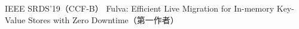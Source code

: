 \cvpub
{IEEE SRDS'19（CCF-B）} %
{Fulva: Efficient Live Migration for In-memory Key-Value Stores with Zero Downtime（第一作者）} %
{} %
{} %
{ %
}
